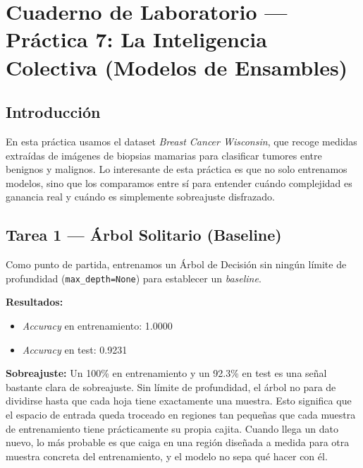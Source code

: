 \documentclass[../../__memoria.tex]{subfiles}
\begin{document}
\standalonecover
\pagestyle{cuerpo}

\graphicspath{{\subfix{../../Imagenes/}}{../../Imagenes/}{\subfix{img/}}{img/}}

\chapter[Práctica 7: Modelos de Ensambles]{Cuaderno de Laboratorio --- Práctica 7: La Inteligencia Colectiva (Modelos de Ensambles)}

\section*{Introducción}
En esta práctica usamos el dataset \textit{Breast Cancer Wisconsin}, que recoge medidas extraídas de imágenes de biopsias mamarias para clasificar tumores entre benignos y malignos. Lo interesante de esta práctica es que no solo entrenamos modelos, sino que los comparamos entre sí para entender cuándo complejidad es ganancia real y cuándo es simplemente sobreajuste disfrazado.

\section[Tarea 1: Árbol Solitario]{Tarea 1 --- Árbol Solitario (Baseline)}

Como punto de partida, entrenamos un Árbol de Decisión sin ningún límite de profundidad (\mbox{\texttt{max\_depth=None}}) para establecer un \textit{baseline}.

\textbf{Resultados:}
\begin{itemize}
    \item \textit{Accuracy} en entrenamiento: 1.0000
    \item \textit{Accuracy} en test: 0.9231
\end{itemize}

\textbf{Sobreajuste:}
Un 100\% en entrenamiento y un 92.3\% en test es una señal bastante clara de sobreajuste. Sin límite de profundidad, el árbol no para de dividirse hasta que cada hoja tiene exactamente una muestra. Esto significa que el espacio de entrada queda troceado en regiones tan pequeñas que cada muestra de entrenamiento tiene prácticamente su propia cajita. Cuando llega un dato nuevo, lo más probable es que caiga en una región diseñada a medida para otra muestra concreta del entrenamiento, y el modelo no sepa qué hacer con él.
\end{document}
